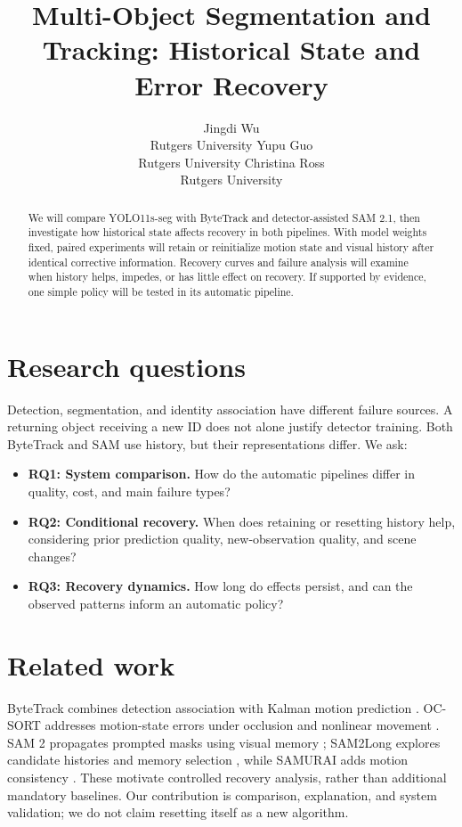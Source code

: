 \documentclass{article}
\title{Multi-Object Segmentation and Tracking: Historical State and Error Recovery}
\author{Jingdi Wu\\
{\normalfont Rutgers University}
\And
Yupu Guo\\
{\normalfont Rutgers University}
\And
Christina Ross\\
{\normalfont Rutgers University}}
\begin{document}
\maketitle


\raggedbottom

\begin{abstract}

We will compare YOLO11s-seg with ByteTrack and detector-assisted SAM 2.1, then investigate how historical state affects recovery in both pipelines. With model weights fixed, paired experiments will retain or reinitialize motion state and visual history after identical corrective information. Recovery curves and failure analysis will examine when history helps, impedes, or has little effect on recovery. If supported by evidence, one simple policy will be tested in its automatic pipeline.

\end{abstract}

\section{Research questions}

Detection, segmentation, and identity association have different failure sources. A returning object receiving a new ID does not alone justify detector training. Both ByteTrack and SAM use history, but their representations differ. We ask:

\begin{itemize}

\item \textbf{RQ1: System comparison.} How do the automatic pipelines differ in quality, cost, and main failure types?

\item \textbf{RQ2: Conditional recovery.} When does retaining or resetting history help, considering prior prediction quality, new-observation quality, and scene changes?

\item \textbf{RQ3: Recovery dynamics.} How long do effects persist, and can the observed patterns inform an automatic policy?

\end{itemize}

\section{Related work}

ByteTrack combines detection association with Kalman motion prediction \citep{zhang2021}. OC-SORT addresses motion-state errors under occlusion and nonlinear movement \citep{cao2023}. SAM 2 propagates prompted masks using visual memory \citep{ravi2024}; SAM2Long explores candidate histories and memory selection \citep{ding2025}, while SAMURAI adds motion consistency \citep{yang2024}. These motivate controlled recovery analysis, rather than additional mandatory baselines. Our contribution is comparison, explanation, and system validation; we do not claim resetting itself as a new algorithm.
\end{document}
